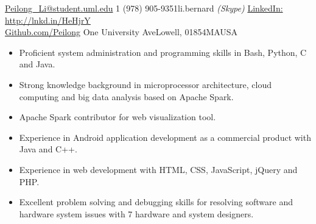 \documentclass[10pt,a4paper]{article} %
\begin{document}
 



\noindent\href{mailto:Peilong\_Li@student.uml.edu}{Peilong\_Li@student.uml.edu}\bull %
\textsmaller{+}1 (978) 905-9351\bull li.bernard \textit{(Skype)}\bull %
\href{http://www.linkedin.com/pub/peilong-li/55/a5/725}{LinkedIn: http://lnkd.in/HeHjrY}\\ %
\href{https://github.com/Peilong}{Github.com/Peilong} \bull
One University Ave\bull Lowell, 01854\bull MA\bull USA %

\spacedhrule{0.5em}{-0.4em} %




\begin{itemize}
  \item Proficient system administration and programming skills in Bash, Python, C and Java.
  \item Strong knowledge background in microprocessor architecture, cloud computing and big data analysis based on Apache Spark.
  \item Apache Spark contributor for web visualization tool.
  \item Experience in Android application development as a commercial product with Java and C++.
  \item Experience in web development with HTML, CSS, JavaScript, jQuery and PHP.
  \item Excellent problem solving and debugging skills for resolving software and hardware system issues with 7 hardware and system designers.
\end{itemize}
\end{document}
